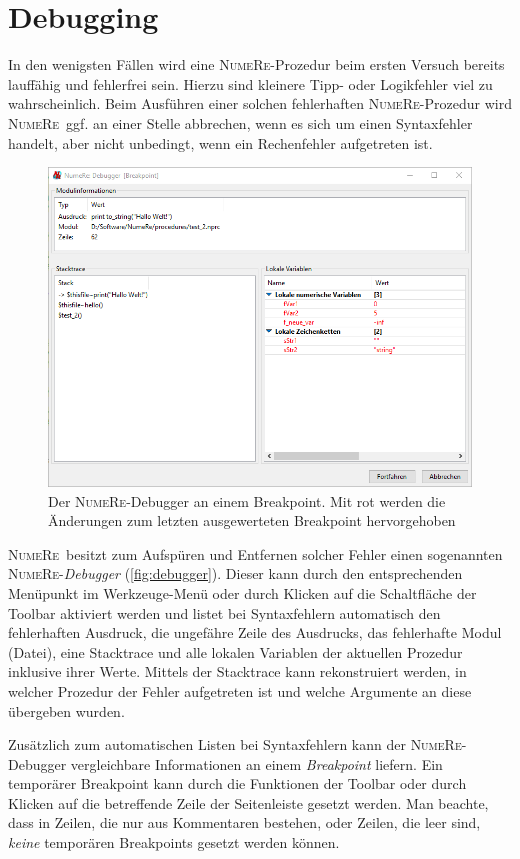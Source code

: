 \documentclass[DIV=14,headsepline,footsepline]{scrbook}
\newcommand{\NR}{\textsc{Nu\-me\-Re}}
\begin{document}
			\section{Debugging}
				In den wenigsten Fällen wird eine \NR-Prozedur beim ersten Versuch bereits lauffähig und fehlerfrei sein. Hierzu sind kleinere Tipp- oder Logikfehler viel zu wahrscheinlich. Beim Ausführen einer solchen fehlerhaften \NR-Prozedur wird \NR\ ggf. an einer Stelle abbrechen, wenn es sich um einen Syntaxfehler handelt, aber nicht unbedingt, wenn ein Rechenfehler aufgetreten ist.
				\begin{figure}[htb]
					\centering
					\includegraphics[width=\textwidth]{_graphics/debugger.png}%
					\caption{Der \NR-Debugger an einem Breakpoint. Mit rot werden die Änderungen zum letzten ausgewerteten Breakpoint hervorgehoben}%
					\label{fig:debugger}%
				\end{figure}
				
				\NR\ besitzt zum Aufspüren und Entfernen solcher Fehler einen sogenannten \NR-\emph{Debugger} (\autoref{fig:debugger}). Dieser kann durch den entsprechenden Menüpunkt im Werkzeuge-Menü oder durch Klicken auf die Schaltfläche der Toolbar aktiviert werden und listet bei Syntaxfehlern automatisch den fehlerhaften Ausdruck, die ungefähre Zeile des Ausdrucks, das fehlerhafte Modul (Datei), eine Stacktrace und alle lokalen Variablen der aktuellen Prozedur inklusive ihrer Werte. Mittels der Stacktrace kann rekonstruiert werden, in welcher Prozedur der Fehler aufgetreten ist und welche Argumente an diese übergeben wurden.
				
				Zusätzlich zum automatischen Listen bei Syntaxfehlern kann der \NR-Debugger vergleichbare Informationen an einem \emph{Breakpoint} liefern. Ein temporärer Breakpoint kann durch die Funktionen der Toolbar oder durch Klicken auf die betreffende Zeile der Seitenleiste gesetzt werden. Man beachte, dass in Zeilen, die nur aus Kommentaren bestehen, oder Zeilen, die leer sind, \emph{keine} temporären Breakpoints gesetzt werden können. 
				
\end{document}
